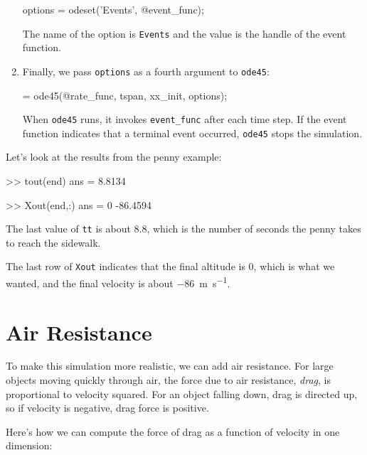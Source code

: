 \begin{enumerate}
\begin{code}
options = odeset('Events', @event_func);
\end{code}
%
The name of the option is \lstinline{Events} and the value is the handle of the event function.

\item Finally, we pass \lstinline{options} as a fourth argument to \lstinline{ode45}:

\begin{code}
 = ode45(@rate_func, tspan, xx_init, options);
\end{code}

When \lstinline{ode45} runs, it invokes \lstinline{event_func} after each time step.  If the event function indicates that a terminal event occurred,
\lstinline{ode45} stops the simulation.

\end{enumerate}

Let's look at the results from the penny example:

\begin{code}
    >> tout(end)
    ans =
    8.8134
    
    >> Xout(end,:)
    ans =
             0  -86.4594
\end{code}

The last value of \lstinline{tt} is about 8.8, which is the number of seconds the penny takes to reach the sidewalk.

The last row of \lstinline{Xout} indicates that the final altitude is 0, which is what we wanted, and the final velocity is about \SI{-86}{\meter \per \second}.


\section{Air Resistance}
\label{air_resistance}


To make this simulation more realistic, we can add air resistance.
For large objects moving quickly through air, the force due to air resistance, \emph{drag}, is proportional to velocity squared.
For an object falling down, drag is
directed up, so if velocity is negative, drag force is positive.


Here's how we can compute the force of drag as a function of velocity in one dimension:

